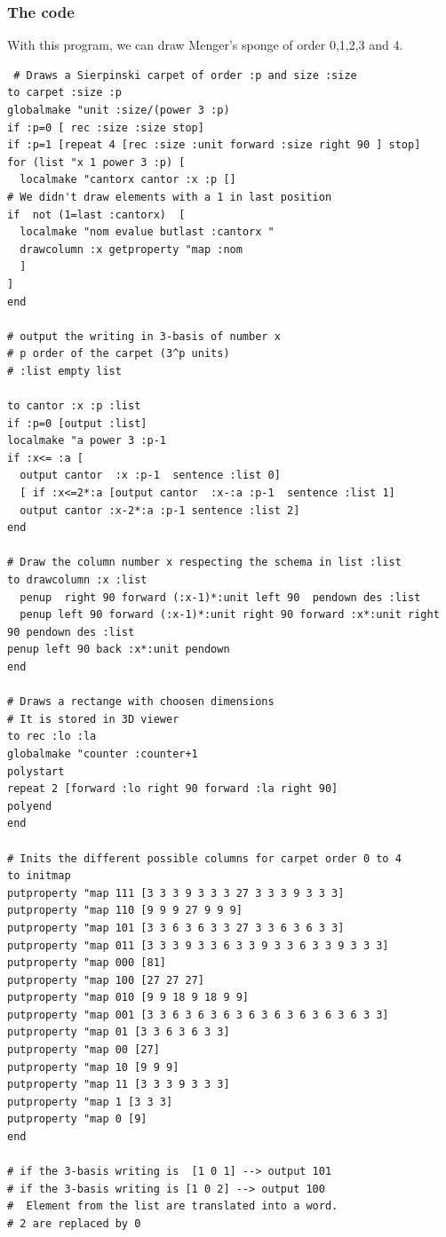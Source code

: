 \subsubsection{The code}
\noindent With this program, we can draw Menger's sponge of order 0,1,2,3 and 4.
\begin{verbatim}
 # Draws a Sierpinski carpet of order :p and size :size
to carpet :size :p
globalmake "unit :size/(power 3 :p)
if :p=0 [ rec :size :size stop]
if :p=1 [repeat 4 [rec :size :unit forward :size right 90 ] stop]
for (list "x 1 power 3 :p) [
  localmake "cantorx cantor :x :p []
# We didn't draw elements with a 1 in last position
if  not (1=last :cantorx)  [
  localmake "nom evalue butlast :cantorx "
  drawcolumn :x getproperty "map :nom
  ]
]  
end

# output the writing in 3-basis of number x
# p order of the carpet (3^p units)
# :list empty list

to cantor :x :p :list
if :p=0 [output :list] 
localmake "a power 3 :p-1
if :x<= :a [
  output cantor  :x :p-1  sentence :list 0] 
  [ if :x<=2*:a [output cantor  :x-:a :p-1  sentence :list 1] 
  output cantor :x-2*:a :p-1 sentence :list 2]
end

# Draw the column number x respecting the schema in list :list
to drawcolumn :x :list
  penup  right 90 forward (:x-1)*:unit left 90  pendown des :list
  penup left 90 forward (:x-1)*:unit right 90 forward :x*:unit right 90 pendown des :list
penup left 90 back :x*:unit pendown
end

# Draws a rectange with choosen dimensions
# It is stored in 3D viewer
to rec :lo :la
globalmake "counter :counter+1
polystart
repeat 2 [forward :lo right 90 forward :la right 90]
polyend
end

# Inits the different possible columns for carpet order 0 to 4
to initmap
putproperty "map 111 [3 3 3 9 3 3 3 27 3 3 3 9 3 3 3]
putproperty "map 110 [9 9 9 27 9 9 9]
putproperty "map 101 [3 3 6 3 6 3 3 27 3 3 6 3 6 3 3]
putproperty "map 011 [3 3 3 9 3 3 6 3 3 9 3 3 6 3 3 9 3 3 3]
putproperty "map 000 [81]
putproperty "map 100 [27 27 27]
putproperty "map 010 [9 9 18 9 18 9 9]
putproperty "map 001 [3 3 6 3 6 3 6 3 6 3 6 3 6 3 6 3 6 3 3]
putproperty "map 01 [3 3 6 3 6 3 3]
putproperty "map 00 [27]
putproperty "map 10 [9 9 9]
putproperty "map 11 [3 3 3 9 3 3 3]
putproperty "map 1 [3 3 3]
putproperty "map 0 [9]
end

# if the 3-basis writing is  [1 0 1] --> output 101
# if the 3-basis writing is [1 0 2] --> output 100
#  Element from the list are translated into a word. 
# 2 are replaced by 0


\end{verbatim}
